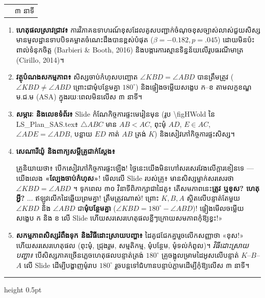 \documentclass[a4paper,12pt]{article}
\makeatletter
\newcommand{\en}[1]{{\TimesEn #1}}
\newcommand{\enbf}[1]{{\TimesEn\textbf{#1}}}
\newcommand{\tri}[1]{\ensuremath{\triangle #1}}
\newcommand{\ang}[1]{\ensuremath{\angle #1}}
\newenvironment{phasebox}[3]{%
  \needspace{2.2cm}%
  \begin{tcolorbox}[
    enhanced, sharp corners, colback=headgray, colframe=black,
    boxrule=1.0pt, top=4pt, bottom=4pt, left=9pt, right=9pt,
    before skip=7pt, after skip=3pt
  ]%
    \renewcommand{\arraystretch}{1.0}%
    \begin{tabular*}{\linewidth}{@{}>{\raggedright\arraybackslash}p{13.60cm}@{\extracolsep{\fill}}r@{}}
      {\muol\fontsize{11pt}{17.5pt}\selectfont #1} & {\fontsize{10.5pt}{15pt}\selectfont\en{#2 |} #3}%
    \end{tabular*}%
  \end{tcolorbox}%
  \begingroup\fontsize{11.5pt}{18.2pt}\selectfont
}{%
  \par\endgroup\vspace{3pt}\hrule height 0.5pt\vspace{5pt}%
}
\makeatother
\begin{document}
\begin{phasebox}{ជំហានទី ២ \enbf{(}ក\enbf{)}៖ កំណែកិច្ចការផ្ទះមេរៀនមុន \enbf{(}ម.ជ.ម\enbf{)} \enbf{---} \enbf{«}ល្បែងចាប់កំហុស\enbf{»}}{02--05 min}{៣ នាទី}
  \begin{enumerate}[leftmargin=0.45cm, topsep=2pt, itemsep=4pt, parsep=0pt]
    \item \textbf{ហេតុផលស្រាវជ្រាវ៖} ការវិភាគឧទាហរណ៍ខុសដែលគូសបញ្ជាក់ចំណុចខុសច្បាស់លាស់ជួយសិស្សមានមូលដ្ឋានទាបបិទគម្លាតចំណេះដឹងបានខ្ពស់បំផុត ($\beta = -0.182, p = .045$) ដោយមិនប៉ះពាល់ទំនុកចិត្ត \en{(Barbieri \& Booth, 2016)} និងបង្ការការស្មានទិន្នន័យលើរូបធរណីមាត្រ \en{(Cirillo, 2014)}។
    \item \textbf{វត្ថុបំណងសកម្មភាព៖} សិស្សចាប់កំហុសបញ្ឆោត $\ang{KBD} = \ang{ABD}$ បានត្រឹមត្រូវ ($\ang{KBD} \neq \ang{ABD}$ ព្រោះជាមុំបន្ថែមគ្នា $180^\circ$) និងផ្ទៀងចម្លើយសង្ខេប ក--ខ តាមលក្ខខណ្ឌ ម.ជ.ម (\en{ASA}) ក្នុងរយៈពេលមិនលើស ៣ នាទី។
    \item \textbf{សម្ភារៈ និងលេខទំព័រ៖} \en{Slide} កំណែកិច្ចការផ្ទះមេរៀនមុន (រូប \en{\textbackslash figHWold} នៃ \en{LS\_Plan\_SAS.tex}៖ $\tri{ABC}$ មាន $AB<AC$, ពុះមុំ $AD$, $E\in AC$, $\ang{ADE}=\ang{ADB}$, បន្លាយ $ED$ កាត់ $AB$ ត្រង់ $K$) និងសៀវភៅកិច្ចការផ្ទះសិស្ស។
    \item \textbf{សេណារីយ៉ូ និងពាក្យសម្ដីគ្រូជាក់ស្ដែង៖}
      \begin{scriptbox}
        {\muol\fontsize{10.8pt}{17pt}\selectfont \enbf{«}គ្រូនិយាយថា៖} បើកសៀវភៅកិច្ចការផ្ទះឡើង! ថ្ងៃនេះយើងមិនហៅសរសេរវែងលើក្ដារខៀនទេ — យើងលេង \textbf{«ល្បែងចាប់កំហុស»}! មើលលើ \en{Slide} របស់គ្រូ៖ មានសិស្សម្នាក់សរសេរថា $\ang{KBD} = \ang{ABD}$ ។ ទុកពេល ៣០ វិនាទីពិភាក្សាជាដៃគូ៖ តើសមភាពនេះ\textbf{ត្រូវ ឬខុស? ហេតុអ្វី?} ... ឥឡូវលើកដៃឆ្លើយព្រមគ្នា! ត្រឹមត្រូវណាស់! ព្រោះ $K, B, A$ ស្ថិតលើបន្ទាត់តែមួយ $\ang{KBD}$ និង $\ang{ABD}$ ជា\textbf{មុំបន្ថែមគ្នា} ($\ang{KBD} = 180^\circ - \ang{ABD}$)! ផ្ទៀងមើលចម្លើយសង្ខេប ក និង ខ លើ \en{Slide} ហើយសរសេរហេតុផលខ្លីៗក្រោយសមភាពកុំឱ្យខ្វះ!»
      \end{scriptbox}
    \item \textbf{សកម្មភាពសិស្សរំពឹងទុក និងវិធីដោះស្រាយបញ្ហា៖} ដៃគូជជែកគ្នារួចលើកសញ្ញាថា «ខុស!» ហើយសរសេរហេតុផល (ពុះមុំ, ជ្រុងរួម, សម្មតិកម្ម, មុំបន្ថែម, មុំទល់កំពូល)។ \textit{វិធីដោះស្រាយបញ្ហា៖} បើសិស្សភាគច្រើនភ្លេចហេតុផលបន្ទាត់ត្រង់ $180^\circ$ គ្រូចង្អុលម្រាមដៃអូសលើបន្ទាត់ $K$--$B$--$A$ លើ \en{Slide} ដើម្បីបង្ហាញមុំរាប $180^\circ$ រួចបន្តទៅជំហានបន្ទាប់ភ្លាមដើម្បីកុំឱ្យលើស ៣ នាទី។
  \end{enumerate}
\end{phasebox}
\end{document}
